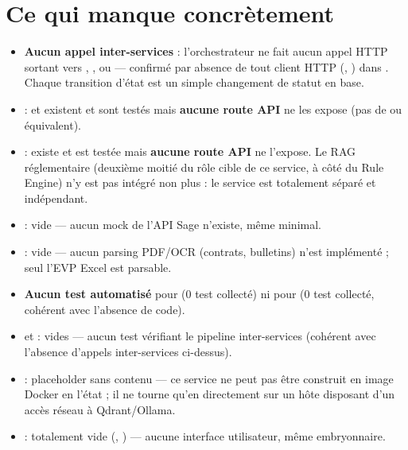 \documentclass[11pt,a4paper]{article}
\begin{document}
\section{Ce qui manque concr\`etement}

\begin{itemize}[leftmargin=1.3em]
\item \textbf{Aucun appel inter-services} : l'orchestrateur ne fait aucun appel HTTP sortant vers , ,  ou  --- confirm\'e par absence de tout client HTTP (, ) dans . Chaque transition d'\'etat est un simple changement de statut en base.
\item {} :  et  existent et sont test\'es mais \textbf{aucune route API} ne les expose (pas de  ou \'equivalent).
\item {} :  existe et est test\'ee mais \textbf{aucune route API} ne l'expose. Le RAG r\'eglementaire (deuxi\`eme moiti\'e du r\^ole cible de ce service, \`a c\^ot\'e du Rule Engine) n'y est pas int\'egr\'e non plus : le service  est totalement s\'epar\'e et ind\'ependant.
\item {} : vide --- aucun mock de l'API Sage n'existe, m\^eme minimal.
\item {} : vide --- aucun parsing PDF/OCR (contrats, bulletins) n'est impl\'ement\'e ; seul l'EVP Excel est parsable.
\item \textbf{Aucun test automatis\'e} pour  (0 test collect\'e) ni pour  (0 test collect\'e, coh\'erent avec l'absence de code).
\item {} et  : vides --- aucun test v\'erifiant le pipeline inter-services (coh\'erent avec l'absence d'appels inter-services ci-dessus).
\item {} : placeholder sans contenu --- ce service ne peut pas \^etre construit en image Docker en l'\'etat ; il ne tourne qu'en  directement sur un h\^ote disposant d'un acc\`es r\'eseau \`a Qdrant/Ollama.
\item {} : totalement vide (, ) --- aucune interface utilisateur, m\^eme embryonnaire.

\end{itemize}
\end{document}
